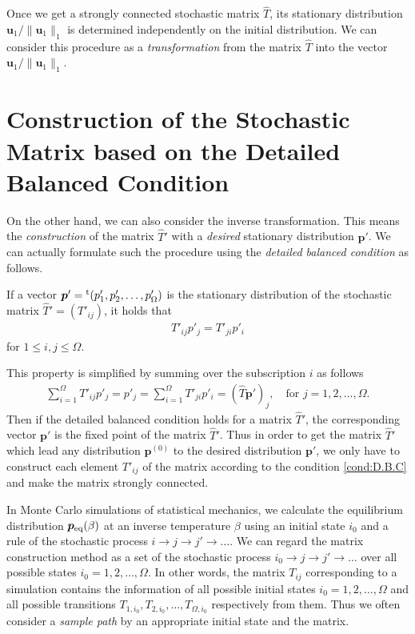 Once we get a strongly connected stochastic matrix $\hat{T}$, its stationary distribution $\bm{u}_{1}/\|\bm{u}_{1}\|_{1}$ is determined independently on the initial distribution. We can consider this procedure as a \textit{transformation} from the matrix $\hat{T}$ into the vector $\bm{u}_{1}/\|\bm{u}_{1}\|_{1}$. 

\section{Construction of the Stochastic Matrix based on the Detailed Balanced Condition}

On the other hand, we can also consider the inverse transformation. This means the \textit{construction} of the matrix $\hat{T}'$ with a \textit{desired} stationary distribution $\bm{p}'$. We can actually formulate such the procedure using the \textit{detailed balanced condition} as follows.
\begin{definition}
	If a vector $\bm{p}'={}^{\rm t}(p'_{1},p'_{2},\dots,p'_{\Omega})$ is the stationary distribution of the stochastic matrix $\hat{T}'=\left(T'_{ij}\right)$, it holds that
	\begin{align}
	T'_{ij}p'_{j} = T'_{ji}p'_{i}\label{cond:D.B.C}
	\end{align}
	for $1\leq i,j\leq \Omega$.
\end{definition}
This property is simplified by summing over the subscription $i$ as follows
\begin{align}
\sum_{i=1}^{\Omega}T'_{ij}p'_{j} = p'_{j} = \sum_{i=1}^{\Omega}T'_{ji}p'_{i} = \left(\hat{T}\bm{p}'\right)_{j},\quad\text{for $j=1,2,\dots,\Omega$}.
\end{align}
Then if the detailed balanced condition holds for a matrix $\hat{T}'$, the corresponding vector $\bm{p}'$ is the fixed point of the matrix $\hat{T}'$. Thus in order to get the matrix $\hat{T}'$ which lead any distribution $\bm{p}^{(0)}$ to the desired distribution $\bm{p}'$, we only have to construct each element $T'_{ij}$ of the matrix according to the condition \eqref{cond:D.B.C} and make the matrix strongly connected.

In Monte Carlo simulations of statistical mechanics, we calculate the equilibrium distribution $\bm{p}_{\rm eq}(\beta)$ at an inverse temperature $\beta$ using an initial state $i_{0}$ and a rule of the stochastic process $i\to j\to j'\to\dots$. We can regard the matrix construction method as a set of the stochastic process $i_{0}\to j\to j'\to\dots$ over all possible states $i_{0}=1,2,\dots,\Omega$. In other words, the matrix $T_{ij}$ corresponding to a simulation contains the information of all possible initial states $i_{0}=1,2,\dots,\Omega$ and all possible transitions $T_{1,i_{0}},T_{2,i_{0}},\dots,T_{\Omega,i_{0}}$ respectively from them. Thus we often consider a \textit{sample path} by an appropriate initial state and the matrix.

